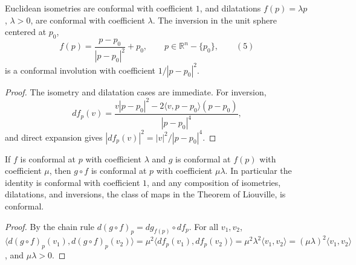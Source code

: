 \begin{example}
  \label{ex:dc-ch8-5-1}

  Euclidean isometries are conformal with coefficient $1$, and dilatations
  $f(p)=\lambda p$, $\lambda>0$, are conformal with coefficient $\lambda$. The
  inversion in the unit sphere centered at $p_0$,
  $$
  f(p)=\frac{p-p_0}{|p-p_0|^2}+p_0,\qquad p\in\mathbb{R}^n-\{p_0\},\qquad(5)
  $$
  is a conformal involution with coefficient $1/|p-p_0|^2$.
\end{example}
\begin{proof}
  \sketch
  The isometry and dilatation cases are immediate. For inversion,
  $$
  df_p(v)=\frac{v|p-p_0|^2-2\langle v,p-p_0\rangle(p-p_0)}{|p-p_0|^4},
  $$
  and direct expansion gives
  $|df_p(v)|^2=|v|^2/|p-p_0|^4$.
\end{proof}

\begin{lemma}
  \label{lem:dc-ch8-5-conformal-comp}


  If $f$ is conformal at $p$ with coefficient $\lambda$ and $g$ is conformal at
  $f(p)$ with coefficient $\mu$, then $g\circ f$ is conformal at $p$ with
  coefficient $\mu\lambda$. In particular the identity is conformal with
  coefficient $1$, and any composition of isometries, dilatations, and inversions,
  the class of maps in the Theorem of Liouville, is conformal.
\end{lemma}
\begin{proof}

\sketch
  By the chain rule $d(g\circ f)_p=dg_{f(p)}\circ df_p$. For all $v_1,v_2$,
  $\langle d(g\circ f)_p(v_1),d(g\circ f)_p(v_2)\rangle
  =\mu^2\langle df_p(v_1),df_p(v_2)\rangle
  =\mu^2\lambda^2\langle v_1,v_2\rangle=(\mu\lambda)^2\langle v_1,v_2\rangle$,
  and $\mu\lambda>0$.
\end{proof}

